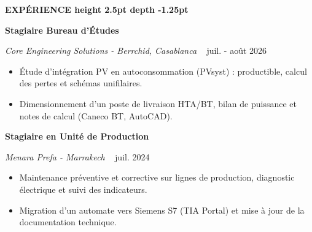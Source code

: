 \documentclass[10pt,a4paper]{altacv}
\renewcommand{\cvsection}[2][]{%
  \vspace{3pt}%
  {\color{heading}\Large\bfseries #2 \hspace{0.2em}\leaders\vrule height 2.5pt depth -1.25pt\hfill\mbox{}}\par\vspace{2.5pt}
}
\renewcommand{\cvevent}[4]{%
  {\normalsize\bfseries\color{accent}#1\par}\vspace{1pt}
  \ifstrequal{#2}{}{}{%
    {\small\itshape\color{emphasis}#2\ifstrequal{#4}{}{}{ - #4}}%
  }%
  ~\hfill
  \ifstrequal{#3}{}{}{{\small\color{emphasis}#3}}%
  \par\vspace{1.5pt}
}
\begin{document}
\cvsection{EXPÉRIENCE}
\cvevent{Stagiaire Bureau d’Études}{Core Engineering Solutions}{juil. - août 2026}{Berrchid, Casablanca}
\begin{itemize}[leftmargin=*, label=\textbullet, nosep, itemsep=1.5pt]
  \item Étude d’intégration PV en autoconsommation (PVsyst) : productible, calcul des pertes et schémas unifilaires.
  \item Dimensionnement d’un poste de livraison HTA/BT, bilan de puissance et notes de calcul (Caneco BT, AutoCAD).
\end{itemize}
\vspace{1.5pt}
\cvevent{Stagiaire en Unité de Production}{Menara Prefa}{juil. 2024}{Marrakech}
\begin{itemize}[leftmargin=*, label=\textbullet, nosep, itemsep=1.5pt]
  \item Maintenance préventive et corrective sur lignes de production, diagnostic électrique et suivi des indicateurs.
  \item Migration d’un automate vers Siemens S7 (TIA Portal) et mise à jour de la documentation technique.
\end{itemize}
\end{document}
